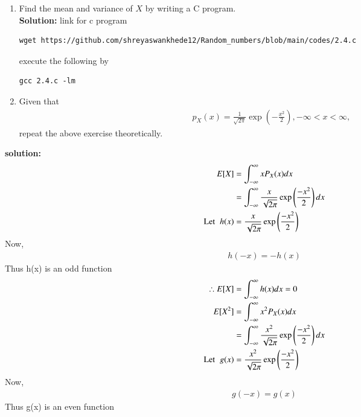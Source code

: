 \documentclass[journal,12pt,twocolumn]{IEEEtran}
\renewcommand\thesection{\arabic{section}}
\providecommand{\brak}[1]{\ensuremath{\left(#1\right)}}
\theoremstyle{remark}
\newcommand{\solution}{\noindent \textbf{Solution: }}
\numberwithin{equation}{section}
\begin{document}
\begin{enumerate}[label=\thesection.\arabic*
,ref=\thesection.\theenumi]
\begin{lstlisting}
wget https://github.com/shreyaswankhede12/Random_numbers/blob/main/codes/2.3_emp_pdf.py
\end{lstlisting}
\begin{figure}
\centering
\texttt{[image: 2.3.pdf]}
\caption{The PDF of $X$}
\label{fig:2.3}
\end{figure}
\item Find the mean and variance of $X$ by writing a C program.\\
\solution link for c program
\begin{lstlisting}
wget https://github.com/shreyaswankhede12/Random_numbers/blob/main/codes/2.4.c
\end{lstlisting}
execute the following by
\begin{lstlisting}
gcc 2.4.c -lm
\end{lstlisting}
\item Given that 
\begin{align}
p_{X}(x) = \frac{1}{\sqrt{2\pi}}\exp\brak{-\frac{x^2}{2}}, -\infty < x < \infty,
\end{align}
repeat the above exercise theoretically.
\end{enumerate}
\textbf{solution:}
\begin{align}
E[X]&=\int_{-\infty}^{\infty}xP_{X}(x)dx\\
&=\int_{-\infty}^{\infty}\dfrac{x}{\sqrt{2\pi}}\exp\brak{\dfrac{-x^2}{2}}dx\\
\text{Let}\hspace{2mm} h(x)&=\dfrac{x}{\sqrt{2\pi}}\exp\brak{\dfrac{-x^2}{2}}\nonumber
\end{align}
Now,
\begin{align}
h(-x)=-h(x)\nonumber
\end{align}
Thus h(x) is an odd function
\begin{align}
\therefore E[X]&=\int_{-\infty}^{\infty}h(x)dx=0\\
E[X^2]&=\int_{-\infty}^{\infty}x^2P_{X}(x)dx\\
&=\int_{-\infty}^{\infty}\dfrac{x^2}{\sqrt{2\pi}}\exp\brak{\dfrac{-x^2}{2}}dx\\
\text{Let}\hspace{2mm} g(x)&=\dfrac{x^2}{\sqrt{2\pi}}\exp\brak{\dfrac{-x^2}{2}}\nonumber
\end{align}
Now,
\begin{align}
g(-x)=g(x)\nonumber
\end{align}
Thus g(x) is an even function\\
\end{document}
